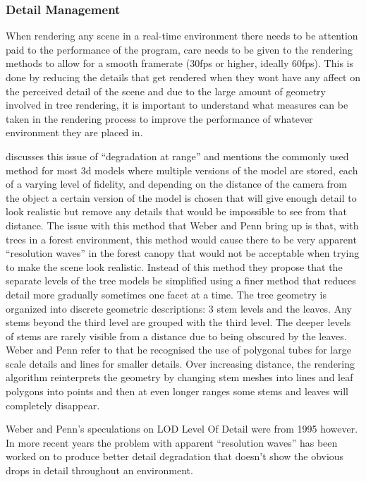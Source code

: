 \documentclass[review]{cmpreport}
\begin{document}
\subsubsection{Detail Management}
When rendering any scene in a real-time environment there needs to be attention paid to the 
performance of the program, care needs to be given to the rendering methods to allow for a 
smooth framerate (30fps or higher, ideally 60fps). This is done by reducing the details that 
get rendered when they wont have any affect on the perceived detail of the scene and due to 
the large amount of geometry involved in tree rendering, it is important to understand what  
measures can be taken in the rendering process to improve the performance of whatever 
environment they are placed in. \par
\cite{weber1995rendering} discusses this issue of ``degradation at range'' and mentions the 
commonly used method for most 3d models where multiple versions of the model are stored, 
each of a varying level of fidelity, and depending on the distance of the camera from the 
object a certain version of the model is chosen that will give enough detail to look realistic 
but remove any details that would be impossible to see from that distance. The issue with this 
method that Weber and Penn bring up is that, with trees in a forest environment, this method 
would cause there to be very apparent ``resolution waves'' in the forest canopy that would not 
be acceptable when trying to make the scene look realistic. Instead of this method they propose 
that the separate levels of the tree models be simplified using a finer method that reduces 
detail more gradually sometimes one facet at a time. The tree geometry is organized into 
discrete geometric descriptions: 3 stem levels and the leaves. Any stems beyond the third 
level are grouped with the third level. The deeper levels of stems are rarely visible from a 
distance due to being obscured by the leaves. Weber and Penn refer to \cite{oppenheimer1986real} 
that he recognised the use of polygonal tubes for large scale details and lines for smaller 
details. Over increasing distance, the rendering algorithm reinterprets the geometry by 
changing stem meshes into lines and leaf polygons into points and then at even longer ranges 
some stems and leaves will completely disappear. \par
Weber and Penn's speculations on LOD {Level Of Detail} were from 1995 however. In more recent 
years the problem with apparent ``resolution waves'' has been worked on to produce better 
detail degradation that doesn't show the obvious drops in detail throughout an environment. 
\end{document}
